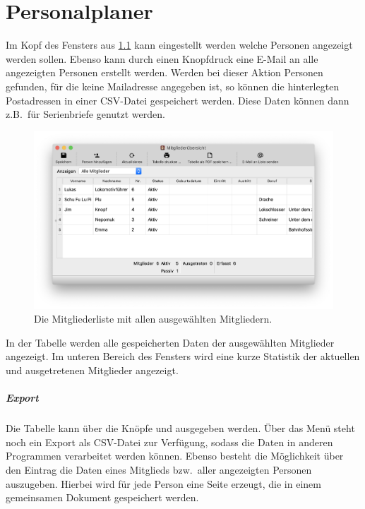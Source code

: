 \chapter{Personalplaner}\label{personal:mitglieder}
Im Kopf des Fensters aus \cref{fig:personal:mitglieder} kann eingestellt werden welche Personen angezeigt werden sollen.
Ebenso kann durch einen Knopfdruck eine E-Mail an alle angezeigten Personen erstellt werden.
Werden bei dieser Aktion Personen gefunden, für die keine Mailadresse angegeben ist,
so können die hinterlegten Postadressen in einer CSV-Datei gespeichert werden.
Diese Daten können dann z.B.\ für Serienbriefe genutzt werden.


\begin{figure}[!h]
	\includegraphics[width=\textwidth]{img/personal-liste}
	\caption{Die Mitgliederliste mit allen ausgewählten Mitgliedern.}
	\label{fig:personal:mitglieder}
\end{figure}

In der Tabelle werden alle gespeicherten Daten der ausgewählten Mitglieder angezeigt.
Im unteren Bereich des Fensters wird eine kurze Statistik
der aktuellen und ausgetretenen Mitglieder angezeigt.

\paragraph{Export}
Die Tabelle kann über die Knöpfe  und  ausgegeben werden.
Über das Menü  steht noch ein Export als CSV-Datei zur Verfügung,
sodass die Daten in anderen Programmen verarbeitet werden können.
Ebenso besteht die Möglichkeit über den Eintrag  die Daten eines Mitglieds bzw.\ aller angezeigten Personen auszugeben.
Hierbei wird für jede Person eine Seite erzeugt, die in einem gemeinsamen Dokument gespeichert werden.
